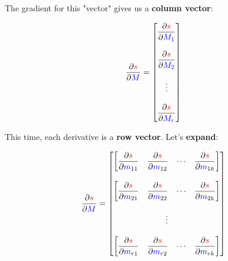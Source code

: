         The gradient for this "vector" gives us a \textbf{column vector}:
        
        \begin{equation}
            \frac{\partial  \textcolor{red}{s} }{\partial  \textcolor{blue}{M} }  
            =
            \begin{bmatrix}
                \dfrac{\partial  \textcolor{red}{s} }{\partial  \textcolor{blue}{M_1} } \\
                \\
                \dfrac{\partial  \textcolor{red}{s} }{\partial  \textcolor{blue}{M_2} } \\
                \\
                \vdots \\
                \\
                \dfrac{\partial  \textcolor{red}{s} }{\partial  \textcolor{blue}{M_r} }
            \end{bmatrix}
        \end{equation}
        
        This time, each derivative is a \textbf{row vector}. Let's \textbf{expand}:
        
        \begin{equation}
            \frac{\partial  \textcolor{red}{s} }{\partial  \textcolor{blue}{M} }  
            =
            \begin{bmatrix}
                \begin{bmatrix}
                    \dfrac{\partial  \textcolor{red}{s} }{\partial  \textcolor{blue}{m}_{11} }    
                    & 
                    \dfrac{\partial  \textcolor{red}{s} }{\partial  \textcolor{blue}{m}_{12} } 
                    & 
                    \cdots 
                    & 
                    \dfrac{\partial  \textcolor{red}{s} }{\partial  \textcolor{blue}{m}_{1k} } 
                \end{bmatrix}
                \\\\
                \begin{bmatrix}
                    \dfrac{\partial  \textcolor{red}{s} }{\partial  \textcolor{blue}{m}_{21} }    
                    & 
                    \dfrac{\partial  \textcolor{red}{s} }{\partial  \textcolor{blue}{m}_{22} } 
                    & 
                    \cdots 
                    & 
                    \dfrac{\partial  \textcolor{red}{s} }{\partial  \textcolor{blue}{m}_{2k} } 
                \end{bmatrix}
                \\\\
                \vdots
                \\\\
                \begin{bmatrix}
                    \dfrac{\partial  \textcolor{red}{s} }{\partial  \textcolor{blue}{m}_{r1} }    
                    & 
                    \dfrac{\partial  \textcolor{red}{s} }{\partial  \textcolor{blue}{m}_{r2} } 
                    & 
                    \cdots 
                    & 
                    \dfrac{\partial  \textcolor{red}{s} }{\partial  \textcolor{blue}{m}_{rk} } 
                \end{bmatrix}
            \end{bmatrix}
        \end{equation}
        
